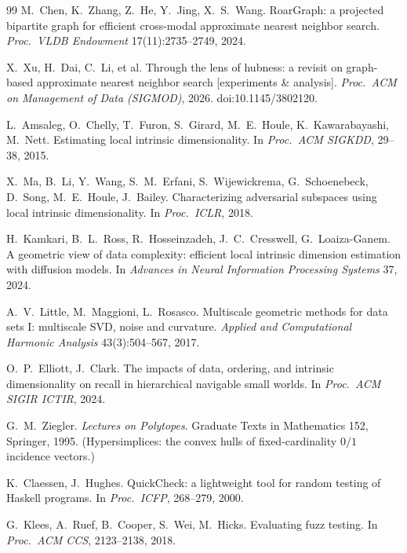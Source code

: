 \documentclass[11pt]{article}
\begin{document}
\begin{thebibliography}{99}
M.~Chen, K.~Zhang, Z.~He, Y.~Jing, X.~S.~Wang.
RoarGraph: a projected bipartite graph for efficient cross-modal
approximate nearest neighbor search.
\emph{Proc.\ VLDB Endowment} 17(11):2735--2749, 2024.

X.~Xu, H.~Dai, C.~Li, et al.
Through the lens of hubness: a revisit on graph-based approximate nearest
neighbor search [experiments \& analysis].
\emph{Proc.\ ACM on Management of Data (SIGMOD)}, 2026.
doi:10.1145/3802120.

L.~Amsaleg, O.~Chelly, T.~Furon, S.~Girard, M.~E.~Houle,
K.~Kawarabayashi, M.~Nett.
Estimating local intrinsic dimensionality.
In \emph{Proc.\ ACM SIGKDD}, 29--38, 2015.

X.~Ma, B.~Li, Y.~Wang, S.~M.~Erfani, S.~Wijewickrema, G.~Schoenebeck,
D.~Song, M.~E.~Houle, J.~Bailey.
Characterizing adversarial subspaces using local intrinsic dimensionality.
In \emph{Proc.\ ICLR}, 2018.

H.~Kamkari, B.~L.~Ross, R.~Hosseinzadeh, J.~C.~Cresswell,
G.~Loaiza-Ganem.
A geometric view of data complexity: efficient local intrinsic dimension
estimation with diffusion models.
In \emph{Advances in Neural Information Processing Systems} 37, 2024.

A.~V.~Little, M.~Maggioni, L.~Rosasco.
Multiscale geometric methods for data sets I: multiscale SVD, noise and
curvature. \emph{Applied and Computational Harmonic Analysis}
43(3):504--567, 2017.

O.~P.~Elliott, J.~Clark.
The impacts of data, ordering, and intrinsic dimensionality on recall in
hierarchical navigable small worlds.
In \emph{Proc.\ ACM SIGIR ICTIR}, 2024.

G.~M.~Ziegler.
\emph{Lectures on Polytopes}. Graduate Texts in Mathematics 152, Springer,
1995. (Hypersimplices: the convex hulls of fixed-cardinality $0/1$ incidence
vectors.)

K.~Claessen, J.~Hughes.
QuickCheck: a lightweight tool for random testing of Haskell programs.
In \emph{Proc.\ ICFP}, 268--279, 2000.

G.~Klees, A.~Ruef, B.~Cooper, S.~Wei, M.~Hicks.
Evaluating fuzz testing.
In \emph{Proc.\ ACM CCS}, 2123--2138, 2018.
\end{thebibliography}
\end{document}
